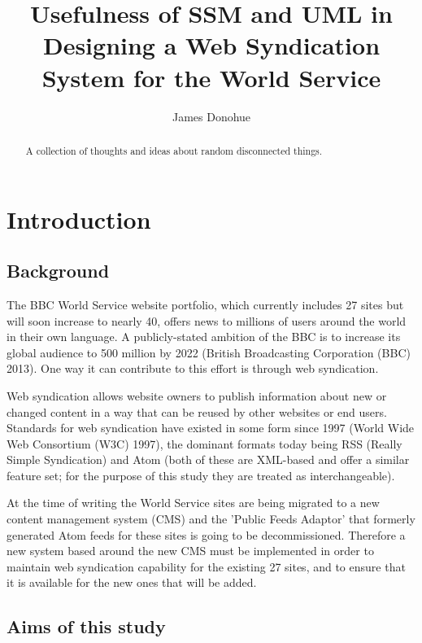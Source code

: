 \documentclass{article}
\begin{document}
\title{Usefulness of SSM and UML in Designing a Web Syndication System for the World Service}
\author{James Donohue}

\maketitle

\begin{abstract}
A collection of thoughts and ideas about random disconnected things.
\end{abstract}

\section{Introduction}
\subsection{Background}

The BBC World Service website portfolio, which currently includes 27 sites but will soon increase to nearly 40, offers news to millions of users around the world in their own language. A publicly-stated ambition of the BBC is to increase its global audience to 500 million by 2022 (British Broadcasting Corporation (BBC) 2013). One way it can contribute to this effort is through web syndication.

Web syndication allows website owners to publish information about new or changed content in a way that can be reused by other websites or end users. Standards for web syndication have existed in some form since 1997 (World Wide Web Consortium (W3C) 1997), the dominant formats today being RSS (Really Simple Syndication) and Atom (both of these are XML-based and offer a similar feature set; for the purpose of this study they are treated as interchangeable).

At the time of writing the World Service sites are being migrated to a new content management system (CMS) and the 'Public Feeds Adaptor' that formerly generated Atom feeds for these sites is going to be decommissioned. Therefore a new system based around the new CMS must be implemented in order to maintain web syndication capability for the existing 27 sites, and to ensure that it is available for the new ones that will be added.

\subsection{Aims of this study}
\end{document}

